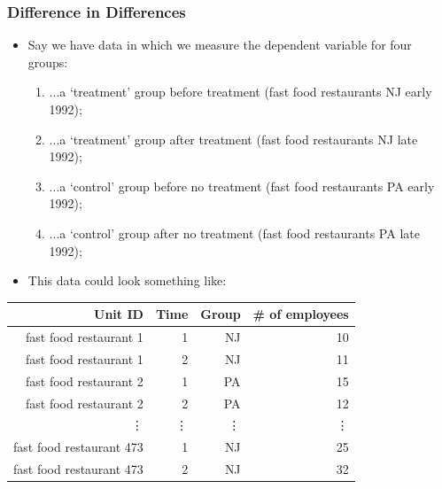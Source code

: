 \documentclass[aspectratio=169]{beamer}
\theoremstyle{principle}
\begin{document}
\begin{frame}
\frametitle{Difference in Differences}

\begin{itemize}
\item Say we have data in which we measure the dependent variable for four groups:
\begin{enumerate}
\item ...a `treatment' group before treatment (fast food restaurants NJ early 1992);
\item \color{black}...a `treatment' group after treatment (fast food restaurants NJ late 1992);
\item \color{black}...a `control' group before no treatment (fast food restaurants PA early 1992);
\item \color{black}...a `control' group after no treatment (fast food restaurants PA late 1992);
\end{enumerate}
\bigskip

\item[]\color{white} This data could look something like:
\end{itemize}
\color{white}
\begin{table}[ht]
\centering
\begin{tabular}{rrrr}
  \hline
  \hline
Unit ID & Time & Group & \# of employees \\ 
  \hline
    \hline
fast food restaurant 1& 1 & NJ & 10 \\ 
fast food restaurant 1 & 2 & NJ & 11 \\ 
fast food restaurant 2 & 1 & PA & 15 \\ 
fast food restaurant 2 & 2 & PA & 12 \\ 
\vdots&\vdots&\vdots&\vdots\\
fast food restaurant 473 & 1 & NJ & 25 \\ 
fast food restaurant 473 & 2 & NJ & 32 \\ 
   \hline
      \hline
\end{tabular}
\end{table}

\end{frame}
\end{document}
